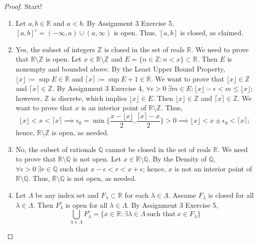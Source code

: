 \documentclass[12pt]{article}
\theoremstyle{definition}
\begin{document}
\begin{proof}
    Start!
    \begin{enumerate}[label=(\alph*)]
        \item Let $a,b \in \mathbb{R}$ and $a < b$. By Assignment 3 Exercise 5, $[a,b]^{c} = (-\infty, a) \cup (a, \infty)$ is open. Thus, $[a,b]$ is closed, as claimed.
        \item Yes, the subset of integers $\mathbb{Z}$ is closed in the set of reals $\mathbb{R}$. We need to prove that $\mathbb{R} \setminus \mathbb{Z}$ is open. Let $x \in \mathbb{R} \setminus \mathbb{Z}$ and $E = \{n \in \mathbb{Z} : n < x\} \subset \mathbb{R}$. Then $E$ is nonempty and bounded above. By the Least Upper Bound Property, $\lfloor x \rfloor := \sup E \in \mathbb{R}$ and $\lceil x \rceil := \sup E + 1 \in \mathbb{R}$. We want to prove that $\lfloor x \rfloor \in \mathbb{Z}$ and $\lceil x \rceil \in \mathbb{Z}$. By Assignment 3 Exercise 4, $\forall \epsilon > 0 \ \exists m \in E : \lfloor x \rfloor - \epsilon < m \leq \lfloor x \rfloor$; however, $\mathbb{Z}$ is discrete, which implies $\lfloor x \rfloor \in E$. Then $\lfloor x \rfloor \in \mathbb{Z}$ and $\lceil x \rceil \in \mathbb{Z}$. We want to prove that $x$ is an interior point of $\mathbb{R} \setminus \mathbb{Z}$. Thus,
        \[
            \lfloor x \rfloor < x < \lceil x \rceil \implies \epsilon_0 = \min\bigg\{\frac{x - \lfloor x \rfloor}{2}, \frac{\lceil x \rceil - x}{2}\bigg\} > 0 \implies \lfloor x \rfloor < x \pm \epsilon_0 < \lceil x \rceil;
        \]
        hence, $\mathbb{R} \setminus \mathbb{Z}$ is open, as needed.
        \item No, the subset of rationals $\mathbb{Q}$ cannot be closed in the set of reals $\mathbb{R}$. We need to prove that $\mathbb{R} \setminus \mathbb{Q}$ is not open. Let $x \in \mathbb{R} \setminus \mathbb{Q}$. By the Density of $\mathbb{Q}$, $\forall \epsilon > 0 \ \exists r \in \mathbb{Q}$ such that $x - \epsilon < r < x + \epsilon$; hence, $x$ is not an interior point of $\mathbb{R} \setminus \mathbb{Q}$. Thus, $\mathbb{R} \setminus \mathbb{Q}$ is not open, as needed.
        \item Let $\Lambda$ be any index set and $F_{\lambda} \subset \mathbb{R}$ for each $\lambda \in \Lambda$. Assume $F_{\lambda}$ is closed for all $\lambda \in \Lambda$. Then $F_{\lambda}^c$ is open for all $\lambda \in \Lambda$. By Assignment 3 Exercise 5,
        \[
            \bigcup_{\lambda \in \Lambda}F_{\lambda}^c = \{x \in \mathbb{R} : \exists \lambda \in \Lambda \ \text{such that} \ x \in F_{\lambda}\}
\]
\end{enumerate}
\end{proof}
\end{document}
